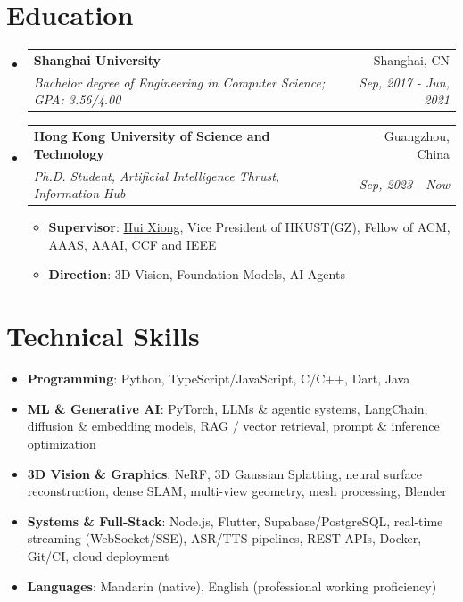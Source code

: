 \documentclass[letterpaper,10.8pt]{article}
\makeatletter
\newcommand{\resumeItem}[2]{
  \item\small{
    \textbf{#1}{: #2 \vspace{-2pt}}
  }
}
\newcommand{\resumeSubheading}[4]{
  \vspace{-1pt}\item
    \begin{tabular*}{0.97\textwidth}{l@{\extracolsep{\fill}}r}
      \textbf{#1} & #2 \\
      \textit{\small#3} & \textit{\small #4} \\
    \end{tabular*}\vspace{-5pt}
}
\newcommand{\resumeSubItem}[2]{\resumeItem{#1}{#2}\vspace{-4pt}}
\newcommand{\resumeSubHeadingListStart}{\begin{itemize}[leftmargin=*]}
\newcommand{\resumeSubHeadingListEnd}{\end{itemize}}
\newcommand{\resumeItemListStart}{\begin{itemize}}
\newcommand{\resumeItemListEnd}{\end{itemize}\vspace{-5pt}}
\makeatother
\begin{document}
\section{Education}
  \resumeSubHeadingListStart
    \resumeSubheading
      {Shanghai University}{Shanghai, CN}
      {Bachelor degree of Engineering in Computer Science;  GPA: 3.56/4.00}{Sep, 2017 - Jun, 2021}
	    
    \resumeSubheading
      {Hong Kong University of Science and Technology}{Guangzhou, China}
      {Ph.D. Student, Artificial Intelligence Thrust, Information Hub}{Sep, 2023 - Now}
      \resumeItemListStart
       \resumeItem{Supervisor}
       {\href{https://www.hkust-gz.edu.cn/people/hui-xiong/}{Hui Xiong}, Vice President of HKUST(GZ), Fellow of ACM, AAAS, AAAI, CCF and IEEE}
       \resumeItem{Direction}
        {3D Vision, Foundation Models, AI Agents}
       \resumeItemListEnd
  
  \resumeSubHeadingListEnd

\section{Technical Skills}
	\resumeSubHeadingListStart
	\resumeSubItem{Programming}{Python, TypeScript/JavaScript, C/C++, Dart, Java}
	\resumeSubItem{ML \& Generative AI}{PyTorch, LLMs \& agentic systems, LangChain, diffusion \& embedding models, RAG / vector retrieval, prompt \& inference optimization}
	\resumeSubItem{3D Vision \& Graphics}{NeRF, 3D Gaussian Splatting, neural surface reconstruction, dense SLAM, multi-view geometry, mesh processing, Blender}
	\resumeSubItem{Systems \& Full-Stack}{Node.js, Flutter, Supabase/PostgreSQL, real-time streaming (WebSocket/SSE), ASR/TTS pipelines, REST APIs, Docker, Git/CI, cloud deployment}
	\resumeSubItem{Languages}{Mandarin (native), English (professional working proficiency)}
\resumeSubHeadingListEnd



\end{document}
